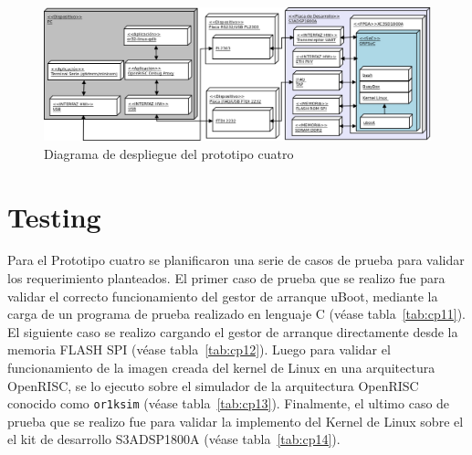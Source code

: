 		\begin{figure}[h!]
 		\begin{center}
  		\includegraphics[width=1.3\textwidth,keepaspectratio=true,angle=90]{./images/proto4}
  		\caption{Diagrama de despliegue del prototipo cuatro}
  		\label{fig:proto4} 
 		\end{center}
		\end{figure}
	
		
 
		\newpage
				
		\section{Testing}	
Para el Prototipo cuatro se planificaron una serie de casos de prueba para validar los requerimiento planteados. El primer caso de prueba que se realizo fue para validar el correcto funcionamiento del gestor de arranque uBoot, mediante la carga de un programa de prueba realizado en lenguaje C (véase tabla~\ref{tab:cp11}). El siguiente caso se realizo cargando el gestor de arranque directamente desde la memoria FLASH SPI (véase tabla~\ref{tab:cp12}). Luego para validar el funcionamiento de la imagen creada del kernel de Linux en una arquitectura OpenRISC, se lo ejecuto sobre el simulador de la arquitectura OpenRISC conocido como \verb|or1ksim| (véase tabla~\ref{tab:cp13}). Finalmente, el ultimo caso de prueba que se realizo fue para validar la implemento del Kernel de Linux sobre el el kit de desarrollo S3ADSP1800A (véase tabla~\ref{tab:cp14}).

